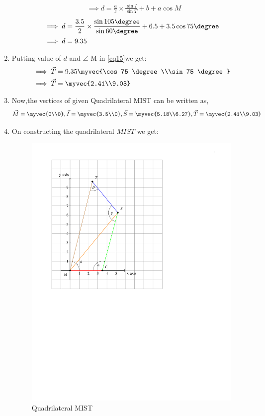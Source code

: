 \documentclass[journal,12pt,twocolumn]{IEEEtran}
\begin{document}
\begin{enumerate}
\begin{align}
&\implies d=\frac{a}{2}\times\frac{\sin I}{\sin T}+ b+a \cos M 
\end{align}
\begin{align}
&\implies d=\frac{3.5}{2}\times\frac{\sin 105 \degree}{\sin 60 \degree}+ 6.5+3.5 \cos75 \degree
\\
&\implies d=9.35
\end{align}
\item Putting value of $d$  and $\angle$ M in \eqref{eq15}we get:
\begin{align}
&\implies \vec{T} =9.35\myvec{\cos 75 \degree\\\sin 75 \degree}
\\
&\implies \vec{T}=\myvec{2.41\\9.03} 
\end{align}
   \item Now,the vertices of given Quadrilateral MIST can be written as,
\begin{align}
 \vec{M}=\myvec{0\\0},\vec{I} = \myvec{3.5\\0}, \vec{S}=\myvec{5.18\\6.27},\vec{T}=\myvec{2.41\\9.03}
\end{align}
    \item On constructing the quadrilateral $MIST$ we get:
\begin{figure}[!ht]
\centering
\includegraphics[width=\columnwidth, height=12 cm]{Fig1.pdf}
\caption{Quadrilateral MIST}
\label{fig:Quadrilateral MIST}	
\end{figure}
\end{enumerate}
\end{document}
